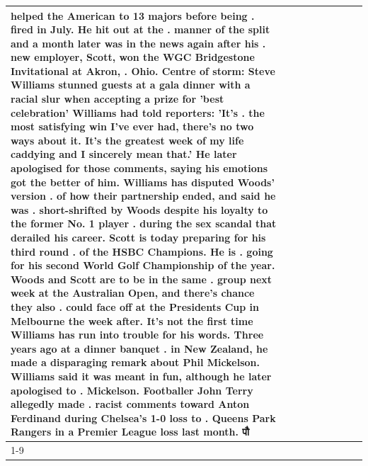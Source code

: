 \begin{table}[H]
\begin{tabular}{lllrlllll}
helped the American to 13 majors before being . fired in July. He hit out at the . manner of the split and a month later was in the news again after his . new employer, Scott, won the WGC Bridgestone Invitational at Akron, . Ohio. Centre of storm: Steve Williams stunned guests at a gala dinner with a racial slur when accepting a prize for 'best celebration' Williams had told reporters: 'It's . the most satisfying win I've ever had, there's no two ways about it. It's the greatest week of my life caddying and I sincerely mean that.' He later apologised for those comments, saying his emotions got the better of him. Williams has disputed Woods' version . of how their partnership ended, and said he was . short-shrifted by Woods despite his loyalty to the former No. 1 player . during the sex scandal that derailed his career. Scott is today preparing for his third round . of the HSBC Champions. He is . going for his second World Golf Championship of the year. Woods and Scott are to be in the same . group next week at the Australian Open, and there's chance they also . could face off at the Presidents Cup in Melbourne the week after. It's not the first time Williams has run into trouble for his words. Three years ago at a dinner banquet . in New Zealand, he made a disparaging remark about Phil Mickelson. Williams said it was meant in fun, although he later apologised to . Mickelson. Footballer John Terry allegedly made . racist comments toward Anton Ferdinand during Chelsea's 1-0 loss to . Queens Park Rangers in a Premier League loss last month. पौ \\
\cline{1-9}

\end{tabular}
\end{table}
